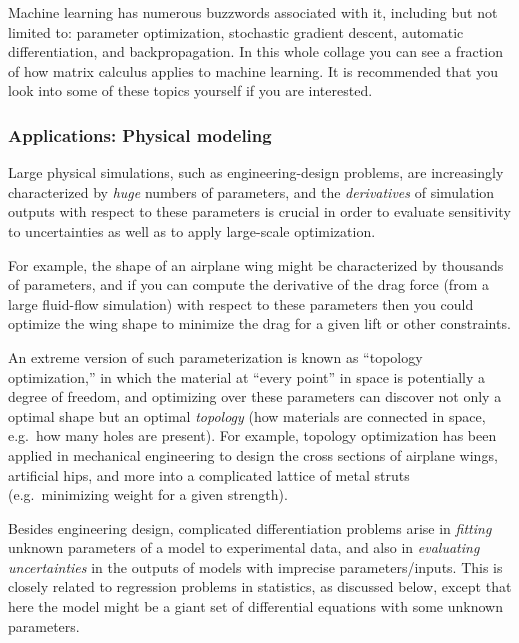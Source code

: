 Machine learning has numerous buzzwords associated with it, including but not limited to: parameter optimization, stochastic gradient descent, automatic differentiation, and backpropagation. In this whole collage you can see a fraction of how matrix calculus applies to machine learning. It is recommended that you look into some of these topics yourself if you are interested.


\subsubsection*{Applications: Physical modeling}

Large physical simulations, such as engineering-design problems, are increasingly characterized by \emph{huge} numbers of parameters, and the \emph{derivatives} of simulation outputs with respect to these parameters is crucial in order to evaluate sensitivity to uncertainties as well as to apply large-scale optimization.

For example, the shape of an airplane wing might be characterized by thousands of parameters, and if you can compute the derivative of the drag force (from a large fluid-flow simulation) with respect to these parameters then you could optimize the wing shape to minimize the drag for a given lift or other constraints.

An extreme version of such parameterization is known as ``topology optimization,'' in which the material at ``every point'' in space is potentially a degree of freedom, and optimizing over these parameters can discover not only a optimal shape but an optimal \emph{topology} (how materials are connected in space, e.g.~how many holes are present).   For example, topology optimization has been applied in mechanical engineering to design the cross sections of airplane wings, artificial hips, and more into a complicated lattice of metal struts (e.g.~minimizing weight for a given strength).

Besides engineering design, complicated differentiation problems arise in \emph{fitting} unknown parameters of a model to experimental data, and also in \emph{evaluating uncertainties} in the outputs of models with imprecise parameters/inputs.   This is closely related to regression problems in statistics, as discussed below, except that here the model might be a giant set of differential equations with some unknown parameters.

